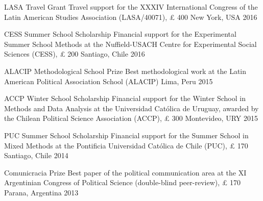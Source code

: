 \vspace{1mm}

\begin{cvhonors}
\cvhonor
{LASA Travel Grant} 
{Travel support for the XXXIV International Congress of the Latin American Studies Association (LASA/40071), {\pounds} 400}
{New York, USA}
{2016}
\end{cvhonors}

\vspace{1mm}

\begin{cvhonors}
\cvhonor
{CESS Summer School Scholarship}
{Financial support for the Experimental Summer School Methods at the Nuffield-USACH Centre for Experimental Social Sciences (CESS), {\pounds} 200}
{Santiago, Chile}
{2016}
\end{cvhonors}

\vspace{1mm}

\begin{cvhonors}
\cvhonor
{ALACIP Methodological School Prize}
{Best methodological work at the Latin American Political Association School (ALACIP)}
{Lima, Peru}
{2015}
\end{cvhonors}

\vspace{1mm}

\begin{cvhonors}
\cvhonor
{ACCP Winter School Scholarship}
{Financial support for the Winter School in Methods and Data Analysis at the Universidad Cat\'olica de Uruguay, awarded by the Chilean Political Science Association (ACCP), {\pounds} 300}
{Montevideo, URY}
{ 2015}
\end{cvhonors}

\vspace{1mm}

\begin{cvhonors}
\cvhonor
{PUC Summer School Scholarship}
{Financial support for the Summer School in Mixed Methods at the Pontificia Universidad Cat\'olica de Chile (PUC), {\pounds} 170}
{Santiago, Chile}
{2014} 
\end{cvhonors}

\vspace{1mm}

\begin{cvhonors}
\cvhonor
{Comunicracia Prize}
{Best paper of the political communication area at the XI Argentinian Congress of Political Science (double-blind peer-review), {\pounds} 170}
{Parana, Argentina}
{2013}
\end{cvhonors}


